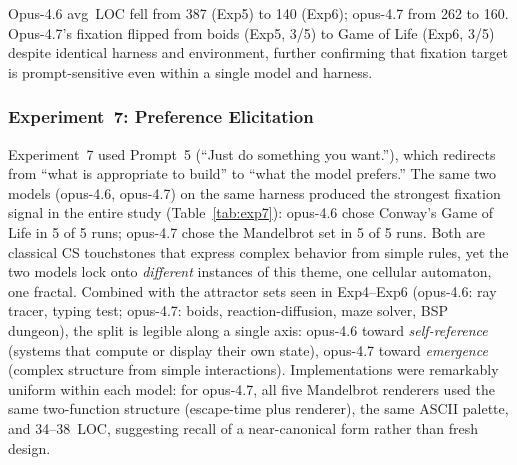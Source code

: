 \documentclass{article}
\begin{document}
\begin{table}[t]
\caption{Experiment~6: Prompt~4 (``Build something. Just do it.''),
  harness 2.1.112.}
\label{tab:exp6}
\small{}
\end{table}

Opus-4.6 avg~LOC fell from 387 (Exp5) to 140 (Exp6); opus-4.7
from 262 to 160. Opus-4.7's fixation flipped from boids (Exp5,
3/5) to Game of Life (Exp6, 3/5) despite identical harness and
environment, further confirming that fixation target is
prompt-sensitive even within a single model and harness.

\subsubsection{Experiment~7: Preference Elicitation}

Experiment~7 used Prompt~5 (``Just do something you want.''),
which redirects from ``what is appropriate to build'' to ``what
the model prefers.'' The same two models (opus-4.6, opus-4.7) on
the same harness produced the strongest fixation signal in the
entire study (Table~\ref{tab:exp7}): opus-4.6 chose Conway's Game
of Life in 5 of 5 runs; opus-4.7 chose the Mandelbrot set in 5
of 5 runs. Both are classical CS touchstones that express complex
behavior from simple rules, yet the two models lock onto
\emph{different} instances of this theme, one cellular
automaton, one fractal. Combined with the attractor sets seen in
Exp4--Exp6 (opus-4.6: ray tracer, typing test; opus-4.7: boids,
reaction-diffusion, maze solver, BSP dungeon), the split is
legible along a single axis: opus-4.6 toward \emph{self-reference}
(systems that compute or display their own state), opus-4.7
toward \emph{emergence} (complex structure from simple
interactions). Implementations were remarkably uniform within
each model: for opus-4.7, all five Mandelbrot renderers used the
same two-function structure (escape-time plus renderer), the
same ASCII palette, and 34--38~LOC, suggesting recall of a
near-canonical form rather than fresh design.
\end{document}
